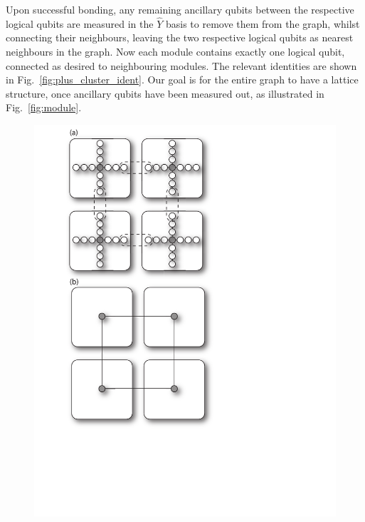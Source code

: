 Upon successful bonding, any remaining ancillary qubits between the respective logical qubits are measured in the $\hat{Y}$ basis to remove them from the graph, whilst connecting their neighbours, leaving the two respective logical qubits as nearest neighbours in the graph. Now each module contains exactly one logical qubit, connected as desired to neighbouring modules. The relevant identities are shown in Fig.~\ref{fig:plus_cluster_ident}. Our goal is for the entire graph to have a lattice structure, once ancillary qubits have been measured out, as illustrated in Fig.~\ref{fig:module}.

\begin{figure}[htpb]
\includegraphics[width=\textwidth]{module}

\end{figure}
